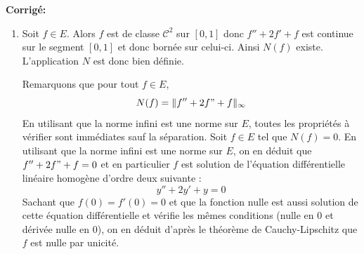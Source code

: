\documentclass[a4paper,twoside,french,11pt]{VcCours}
\newcommand{\corr}{\textbf{Corrigé:}}
\begin{document}
\corr 
\begin{enumerate}
\item Soit $f \in E$. Alors $f$ est de classe $\mathcal{C}^2$ sur $[0,1]$ donc $f''+2f'+f$ est continue sur le segment $[0,1]$ et donc bornée sur celui-ci. Ainsi $N(f)$ existe. L'application $N$ est donc bien définie.


Remarquons que pour tout $f \in E$,
$$ N(f) = \Vert f''+2f"+f \Vert_{\infty}$$
En utilisant que la norme infini est une norme sur $E$, toutes les propriétés à vérifier sont immédiates sauf la séparation. Soit $f \in E$ tel que $N(f)=0$. En utilisant que la norme infini est une norme sur $E$, on en déduit que $f''+2f"+f=0$ et en particulier $f$ est solution de l'équation différentielle linéaire homogène d'ordre deux suivante :
$$ y''+ 2y'+y = 0$$
Sachant que $f(0)=f'(0)=0$ et que la fonction nulle est aussi solution de cette équation différentielle et vérifie les mêmes conditions (nulle en $0$ et dérivée nulle en $0$), on en déduit d'après le théorème de Cauchy-Lipschitz que $f$ est nulle par unicité.


\end{enumerate}
\end{document}
